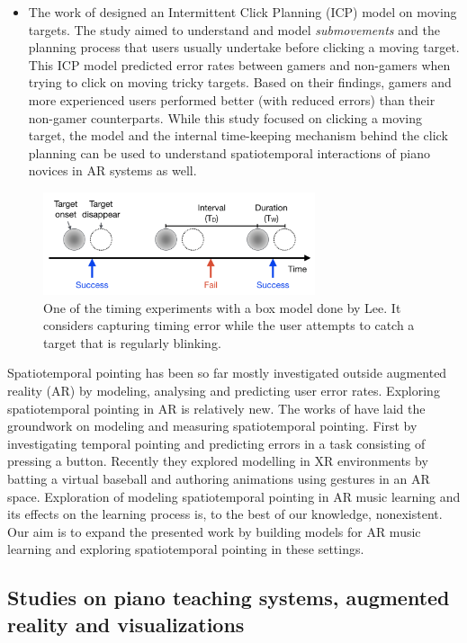 \documentclass[manuscript,screen]{acmart}
\begin{document}
\begin{itemize}
\item The work of \citet{park2020intermittent} designed an Intermittent Click Planning (ICP) model on moving targets. The study aimed to understand and model \textit{submovements} and the planning process that users usually undertake before clicking a moving target. This ICP model predicted error rates between gamers and non-gamers when trying to click on moving tricky targets. Based on their findings, gamers and more experienced users performed better (with reduced errors) than their non-gamer counterparts. While this study focused on clicking a moving target, the model and the internal time-keeping mechanism behind the click planning can be used to understand spatiotemporal interactions of piano novices in AR systems as well. 
\end{itemize}

\begin{figure}[t]
\centering
 \includegraphics[width=8cm]{figures/boxmodel.png}
    \caption{One of the timing experiments with a box model done by Lee. It considers capturing timing error while the user attempts to catch a target that is regularly blinking.
    }\label{fig:boxmodel}
\end{figure}

Spatiotemporal pointing has been so far mostly investigated outside augmented reality (AR) by modeling, analysing and predicting user error rates. Exploring spatiotemporal pointing in AR is relatively new. The works of \citet{liao2020button, lee2019geometrically, arora2019magicalhands} have laid the groundwork on modeling and measuring spatiotemporal pointing. First by investigating temporal pointing and predicting errors in a task consisting of pressing a button. Recently they explored modelling in XR environments by batting a virtual baseball and authoring animations using gestures in an AR space. Exploration of modeling spatiotemporal pointing in AR music learning and its effects on the learning process is, to the best of our knowledge, nonexistent. Our aim is to expand the presented work by building models for AR music learning and exploring spatiotemporal pointing in these settings. 

\subsection{Studies on piano teaching systems, augmented reality and visualizations}
\end{document}
